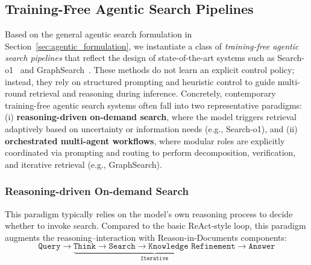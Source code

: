 

\subsection{Training-Free Agentic Search Pipelines}
\label{sec:training_free_agents}
Based on the general agentic search formulation in Section~\ref{sec:agentic_formulation}, we instantiate a class of \emph{training-free agentic search pipelines} that reflect the design of state-of-the-art systems such as Search-o1~\cite{li2025searcho1} and GraphSearch~\cite{yang2025graphsearch}. These methods do not learn an explicit control policy; instead, they rely on structured prompting and heuristic control to guide multi-round retrieval and reasoning during inference. Concretely, contemporary training-free agentic search systems often fall into two representative paradigms: (i) \textbf{reasoning-driven on-demand search}, where the model triggers retrieval adaptively based on uncertainty or information needs (e.g., Search-o1), and (ii) \textbf{orchestrated multi-agent workflows}, where modular roles are explicitly coordinated via prompting and routing to perform decomposition, verification, and iterative retrieval (e.g., GraphSearch).
\subsubsection{Reasoning-driven On-demand Search}
This paradigm typically relies on the model’s own reasoning process to decide whether to invoke search. Compared to the basic ReAct-style loop, this paradigm augments the reasoning--interaction with Reason-in-Documents components:
\[
\texttt{Query} \rightarrow
\underbrace{\texttt{Think} \rightarrow \texttt{Search} \rightarrow \texttt{Knowledge Refinement}}_{\texttt{Iterative}}
\rightarrow \texttt{Answer}
\]

